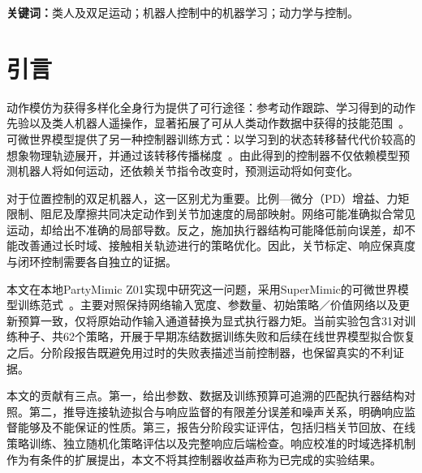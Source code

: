 \begin{abstract}
可微世界模型使控制器同时受到运动预测误差与指令敏感度误差的影响。本文研究面向26关节Z01双足机器人的执行器结构化状态转移，并将上述两类误差与闭环控制性能分别评估。该框架结合辨识关节参数、显式力矩通道以及成对有限幅度响应诊断。通过分支误差和扰动噪声分析，说明轨迹拟合改善为何不必然带来响应或控制改善。归档参数对照在八条关节记录中的七条上同时降低角度、速度和力矩预测误差。当前在线实验完成31对匹配训练种子，每个模型执行5000次策略更新和25000次世界模型更新。在163条参考动作上，4090批次中匹配模型／结构化模型的平均完成率分别为89.11\%／89.85\%，5080批次分别为88.90\%／87.79\%。按种子配对计算的校准角度误差平均降幅分别为3.09\%和5.30\%，但未观察到一致的控制改善。两次独立进程的完整CPU/GPU检查分别有65和67个响应块未通过，总数均为516。结果支持所研究条件下的前向预测收益，同时表明响应有效性和策略优化仍是支持更强控制结论的待解决条件。
\end{abstract}

\noindent\textbf{关键词：}类人及双足运动；机器人控制中的机器学习；动力学与控制。

\section{引言}
动作模仿为获得多样化全身行为提供了可行途径：参考动作跟踪、学习得到的动作先验以及类人机器人遥操作，显著拓展了可从人类动作数据中获得的技能范围~\cite{deepmimic,amp,omnih2o}。可微世界模型提供了另一种控制器训练方式：以学习到的状态转移替代代价较高的想象物理轨迹展开，并通过该转移传播梯度~\cite{supermimic}。由此得到的控制器不仅依赖模型预测机器人将如何运动，还依赖关节指令改变时，预测运动将如何变化。

对于位置控制的双足机器人，这一区别尤为重要。比例—微分（PD）增益、力矩限制、阻尼及摩擦共同决定动作到关节加速度的局部映射。网络可能准确拟合常见运动，却给出不准确的局部导数。反之，施加执行器结构可能降低前向误差，却不能改善通过长时域、接触相关轨迹进行的策略优化。因此，关节标定、响应保真度与闭环控制需要各自独立的证据。

本文在本地PartyMimic Z01实现中研究这一问题，采用SuperMimic的可微世界模型训练范式~\cite{supermimic}。主要对照保持网络输入宽度、参数量、初始策略／价值网络以及更新预算一致，仅将原始动作输入通道替换为显式执行器力矩。当前实验包含31对训练种子、共62个策略，开展于早期冻结数据训练失败和后续在线世界模型拟合恢复之后。分阶段报告既避免用过时的失败表描述当前控制器，也保留真实的不利证据。

本文的贡献有三点。第一，给出参数、数据及训练预算可追溯的匹配执行器结构对照。第二，推导连接轨迹拟合与响应监督的有限差分误差和噪声关系，明确响应监督能够及不能保证的性质。第三，报告分阶段实证评估，包括归档关节回放、在线策略训练、独立随机化策略评估以及完整响应后端检查。响应校准的时域选择机制作为有条件的扩展提出，本文不将其控制器收益声称为已完成的实验结果。

